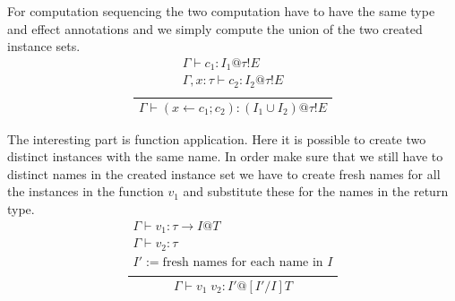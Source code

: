 \documentclass[12pt]{article}
\begin{document}
For computation sequencing the two computation have to have the same type and effect annotations and we simply compute the union of the two created instance sets.
\[\frac{
	\begin{array}{l}
	\Gamma \vdash c_1 : I_1@\tau!E \\
	\Gamma , x : \tau \vdash c_2 : I_2@\tau!E \\
	\end{array}
}{
	\begin{array}{l}
	\Gamma \vdash (x \leftarrow c_1 ; c_2) : (I_1 \cup I_2)@\tau!E
	\end{array}
}\]

The interesting part is function application. Here it is possible to create two distinct instances with the same name.
In order make sure that we still have to distinct names in the created instance set we have to create fresh names for all the instances in the function $v_1$ and substitute these for the names in the return type.
\[\frac{
	\begin{array}{l}
	\Gamma \vdash v_1 : \tau \rightarrow I@T \\
	\Gamma \vdash v_2 : \tau \\
	I' := \text{fresh names for each name in } I \\
	\end{array}
}{
	\begin{array}{l}
	\Gamma \vdash v_1 \; v_2 : I'@[I'/I]T
	\end{array}
}\]
\end{document}
